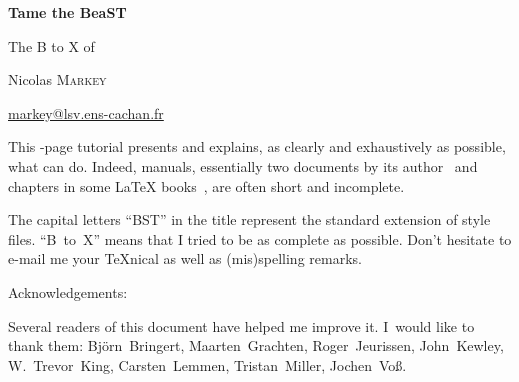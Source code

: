 \documentclass[twoside,openright]{article}
\begin{document}
\SetDate[\ttbdate]
\setcounter{parttocdepth}{3}
\doparttoc

\begin{center}
{\Huge\bfseries Tame the BeaST} 
\par\bigskip
{\large The B to X of \bt} 
\par\bigskip
Nicolas \textsc{Markey} 
\par
\href{mailto:markey@lsv.ens-cachan.fr}{markey@lsv.ens-cachan.fr}
\end{center}
\vfil\vfil
\begin{center}
\vfil
\begin{minipage}{.8\textwidth}
This \pageref{lastpage}-page tutorial presents and explains, as clearly and
exhaustively as possible, what \bt can do. 
Indeed, \bt manuals, essentially two documents by its 
author~\cite{btxdoc,btxhak} and chapters in some \LaTeX
books~\cite[...]{latex:dps,latex:lc,latex:lc2}, are often 
short and incomplete.

The capital letters ``BST'' in the title represent the standard extension of
\bt style files. ``B~to~X'' means that I tried to be as complete as
possible. Don't hesitate to e-mail me your \TeX{}nical as well as
(mis)spelling remarks.
\end{minipage}
\end{center}
\vfil\vfil
\begin{center}
\begin{minipage}{.8\textwidth}
\tableofcontents
\end{minipage}
\end{center}
\vfil

\clearpage

\vbox{}
\vfill

\noindent
\begin{center}
\begin{minipage}{.7\linewidth}
\centerline{\Large\textsf{Acknowledgements:}}

\bigskip
Several readers of this document have helped me improve it. I~would
like to thank them: 
Bj\"orn~Bringert,
Maarten~Grachten,
Roger~Jeurissen,
John~Kewley,
W.~Trevor~King,
Carsten~Lemmen,
Tristan~Miller,
Jochen~Vo\ss.
\end{minipage}
\end{center}
\vfill
\vfill






\end{document}
